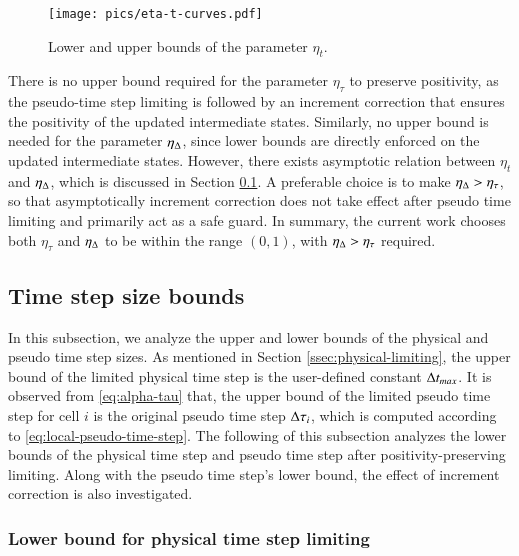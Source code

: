 \begin{figure}[htbp!]
    \centering
    \texttt{[image: pics/eta-t-curves.pdf]}
    \caption{Lower and upper bounds of the parameter $\eta_t$.}
    \label{fig:eta-t-curves}
\end{figure}

There is no upper bound required for the parameter $\eta_\tau$ to preserve positivity, 
as the pseudo-time step limiting is followed by an increment correction 
that ensures the positivity of the updated intermediate states. 
Similarly, no upper bound is needed for the parameter $\eta_{\mathrm\Delta}$, 
since lower bounds are directly enforced on the updated intermediate states. 
However, there exists asymptotic relation between $\eta_t$ and $\eta_\mathrm\Delta$,
which is discussed in Section \ref{ssec:analysis-time-step}.
A preferable choice is to make $\eta_\mathrm\Delta > \eta_\tau$, so that 
asymptotically increment correction does not take effect after 
pseudo time limiting and primarily act as a safe guard.
In summary, the current work 
chooses both $\eta_\tau$ and $\eta_{\mathrm\Delta}$ to be within the range $(0,1)$, 
with $\eta_\mathrm\Delta > \eta_\tau$ required. 

\subsection{Time step size bounds}
\label{ssec:analysis-time-step}
In this subsection, we analyze the upper and lower bounds of the physical and pseudo time step sizes. As mentioned in Section \ref{ssec:physical-limiting}, the upper bound of the limited physical time step is the user-defined constant $\mathrm\Delta t_{max}$.
It is observed from \eqref{eq:alpha-tau} that, the upper bound of the limited pseudo time step for cell $i$ is the original pseudo time step $\mathrm\Delta \tau_i$, which is computed according to \eqref{eq:local-pseudo-time-step}. 
The following of this subsection analyzes the lower bounds
of the physical time step and pseudo time step after positivity-preserving limiting. 
Along with the pseudo time step's lower bound, the effect of 
increment correction is also investigated.

\subsubsection{Lower bound for physical time step limiting}

